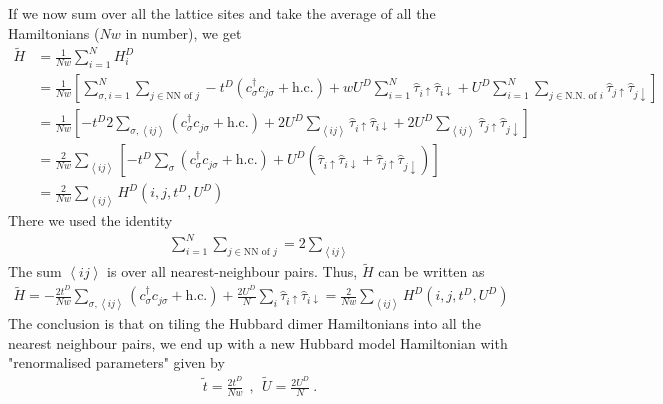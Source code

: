 \documentclass[12pt]{article}
\numberwithin{equation}{section}
\begin{document}
If we now sum over all the lattice sites and take the average of all the Hamiltonians (\(Nw\) in number), we get
\begin{equation}\begin{aligned}
	\tilde H &= \frac{1}{Nw}\sum_{i=1}^N H^D_{i} \\
		      &= \frac{1}{Nw}\left[\sum_{\sigma, i=1}^N\sum_{j \in \text{NN of }j}-t^D\left(c^\dagger_{\sigma}c_{j\sigma} + \text{h.c.}\right) + w U^D\sum_{i=1}^N \hat \tau_{i \uparrow}\hat \tau_{i \downarrow} + U^D\sum_{i=1}^N\sum_{j \in \text{N.N. of }i}\hat \tau_{j \uparrow}\hat \tau_{j \downarrow}\right] \\
		      &= \frac{1}{Nw}\left[-t^D 2\sum_{\sigma, \left<ij\right>}\left(c^\dagger_{\sigma}c_{j\sigma} + \text{h.c.}\right) + 2 U^D\sum_{\left<ij\right>} \hat \tau_{i \uparrow}\hat \tau_{i \downarrow} + 2 U^D\sum_{\left<ij\right>} \hat \tau_{j \uparrow}\hat \tau_{j \downarrow}\right]\\
		      &= \frac{2}{Nw}\sum_{\left<ij\right>}\left[-t^D \sum_\sigma \left(c^\dagger_{\sigma}c_{j\sigma} + \text{h.c.}\right) + U^D\left(\hat \tau_{i \uparrow}\hat \tau_{i \downarrow} + \hat \tau_{j \uparrow}\hat \tau_{j \downarrow}\right)\right]\\
		      &= \frac{2}{Nw}\sum_{\left<ij \right>} H^D(i,j,t^D, U^D)
\end{aligned}\end{equation}
There we used the identity
\begin{equation}\begin{aligned}
	\sum_{i=1}^N\sum_{j \in \text{NN of }j} = 2\sum_{\left<ij\right>}
\end{aligned}\end{equation}
The sum $\left<ij\right>$ is over all nearest-neighbour pairs. Thus, $\tilde H$ can be written as
\begin{equation}\begin{aligned}
	\label{H_tiled}
	\tilde H = - \frac{2t^D}{Nw}\sum_{\sigma, \left<ij \right>}\left(c^\dagger_{\sigma}c_{j\sigma} + \text{h.c.}\right) + \frac{2U^D}{N}\sum_i \hat \tau_{i \uparrow}\hat \tau_{i \downarrow} = \frac{2}{Nw}\sum_{\left<ij \right>} H^D(i,j,t^D, U^D)
\end{aligned}\end{equation}
The conclusion is that on tiling the Hubbard dimer Hamiltonians into all the nearest neighbour pairs, we end up with a new Hubbard model Hamiltonian with "renormalised parameters" given by
\begin{equation}\begin{aligned}
	\tilde t = \frac{2t^D}{Nw}~~,~~ \tilde U = \frac{2U^D}{N}~.
\end{aligned}\end{equation}
\end{document}
